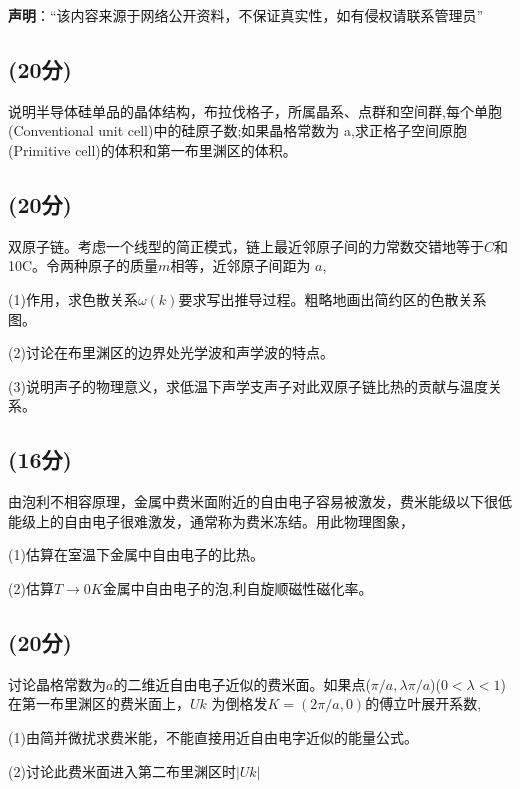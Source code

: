 
\textbf{声明}：“该内容来源于网络公开资料，不保证真实性，如有侵权请联系管理员”


\subsection{(20分)}
说明半导体硅单品的晶体结构，布拉伐格子，所属晶系、点群和空间群,每个单胞(Conventional unit cell)中的硅原子数;如果晶格常数为 a,求正格子空间原胞(Primitive cell)的体积和第一布里渊区的体积。
\subsection{(20分)}
双原子链。考虑一个线型的简正模式，链上最近邻原子间的力常数交错地等于$C$和 10C。令两种原子的质量$m$相等，近邻原子间距为 $a$,

(1)作用，求色散关系$\omega(k)$要求写出推导过程。粗略地画出简约区的色散关系图。

(2)讨论在布里渊区的边界处光学波和声学波的特点。

(3)说明声子的物理意义，求低温下声学支声子对此双原子链比热的贡献与温度关系。
\subsection{(16分)}
由泡利不相容原理，金属中费米面附近的自由电子容易被激发，费米能级以下很低能级上的自由电子很难激发，通常称为费米冻结。用此物理图象，

(1)估算在室温下金属中自由电子的比热。

(2)估算$T\to 0K$金属中自由电子的泡,利自旋顺磁性磁化率。
\subsection{(20分)}
讨论晶格常数为$a$的二维近自由电子近似的费米面。如果点($\pi/a,\lambda \pi/a$)($0<\lambda<1$)在第一布里渊区的费米面上，$Uk$ 为倒格发$K=(2\pi/a,0)$的傅立叶展开系数,

(1)由简并微扰求费米能，不能直接用近自由电字近似的能量公式。

(2)讨论此费米面进入第二布里渊区时$|Uk|$